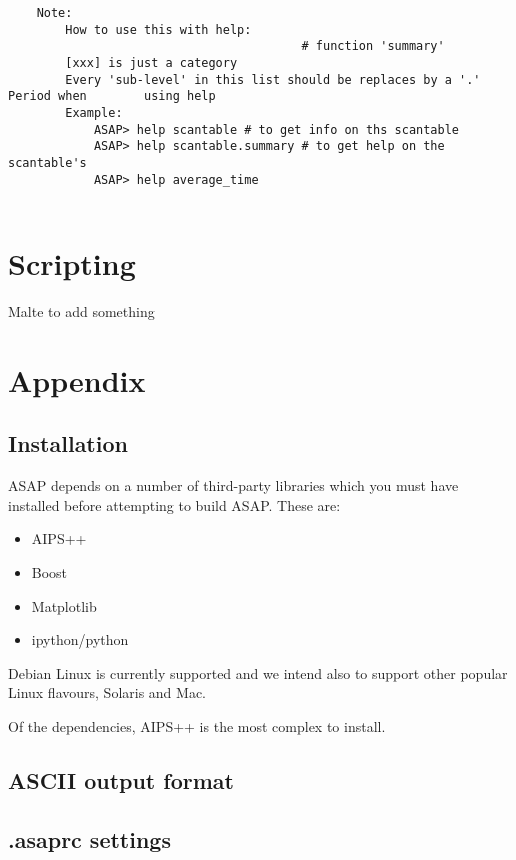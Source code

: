 \documentclass[11pt]{article}
\begin{document}
\begin{verbatim}
    Note:
        How to use this with help:
                                         # function 'summary'
        [xxx] is just a category
        Every 'sub-level' in this list should be replaces by a '.' Period when        using help
        Example:
            ASAP> help scantable # to get info on ths scantable
            ASAP> help scantable.summary # to get help on the scantable's
            ASAP> help average_time


\end{verbatim}

\section{Scripting}

Malte to add something

\section{Appendix}

\subsection{Installation}


ASAP depends on a number of third-party libraries which you must
have installed before attempting to build ASAP. These are:

\begin{itemize}
\item AIPS++
\item Boost
\item Matplotlib
\item ipython/python
\end{itemize}

Debian Linux is currently supported and we intend also
to support other popular Linux flavours, Solaris and Mac.

Of the dependencies, AIPS++ is the most complex to install.

\subsection{ASCII output format}

\subsection{.asaprc settings}
\end{document}
